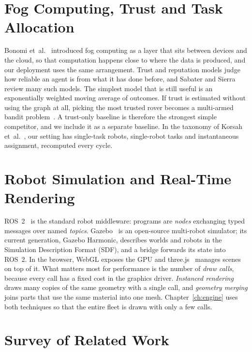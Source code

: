 \section{Fog Computing, Trust and Task Allocation}

Bonomi et~al.~\cite{bonomi2012} introduced fog computing as a layer that sits
between devices and the cloud, so that computation happens close to where the
data is produced, and our deployment uses the same arrangement. Trust and
reputation models judge how reliable an agent is from what it has done before,
and Sabater and Sierra~\cite{sabater2005} review many such models. The simplest
model that is still useful is an exponentially weighted moving average of
outcomes. If trust is estimated without using the graph at all, picking the
most trusted rover becomes a multi-armed bandit problem~\cite{auer2002}. A
trust-only baseline is therefore the strongest simple competitor, and we
include it as a separate baseline. In the
taxonomy of Korsah et~al.~\cite{korsah2013}, our setting has single-task robots,
single-robot tasks and instantaneous assignment, recomputed every cycle.

\section{Robot Simulation and Real-Time Rendering}

ROS~2~\cite{macenski2022} is the standard robot middleware: programs are
\emph{nodes} exchanging typed messages over named \emph{topics}. Gazebo~\cite{koenig2004}
is an open-source multi-robot simulator; its current generation, Gazebo
Harmonic, describes worlds and robots in the Simulation Description Format
(SDF), and a bridge forwards its state into ROS~2. In the browser, WebGL exposes
the GPU and three.js~\cite{threejs} manages scenes on top of it. What matters
most for performance is the number of \emph{draw calls}, because every call
has a fixed cost in the graphics driver. \emph{Instanced rendering} draws many
copies of the same geometry with a single call, and \emph{geometry merging}
joins parts that use the same material into one mesh. Chapter~\ref{ch:engine}
uses both techniques so that the entire fleet is drawn with only a few
calls.

\section{Survey of Related Work}

